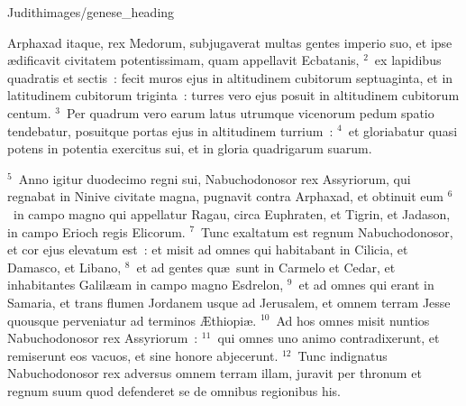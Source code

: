 {Judith}{images/genese_heading}


\bchapter
\lettrine[lines=6,image=true,loversize=0.05,lraise=-0.03]{A}{}rphaxad itaque, rex Medorum, subjugaverat multas gentes imperio suo, et ipse \ae dificavit civitatem potentissimam, quam appellavit Ecbatanis,
${}^{2}$~ex lapidibus quadratis et sectis~: fecit muros ejus in altitudinem cubitorum septuaginta, et in latitudinem cubitorum triginta~: turres vero ejus posuit in altitudinem cubitorum centum.
${}^{3}$~Per quadrum vero earum latus utrumque vicenorum pedum spatio tendebatur, posuitque portas ejus in altitudinem turrium~:
${}^{4}$~et gloriabatur quasi potens in potentia exercitus sui, et in gloria quadrigarum suarum.


${}^{5}$~Anno igitur duodecimo regni sui, Nabuchodonosor rex Assyriorum, qui regnabat in Ninive civitate magna, pugnavit contra Arphaxad, et obtinuit eum
${}^{6}$~in campo magno qui appellatur Ragau, circa Euphraten, et Tigrin, et Jadason, in campo Erioch regis Elicorum.
${}^{7}$~Tunc exaltatum est regnum Nabuchodonosor, et cor ejus elevatum est~: et misit ad omnes qui habitabant in Cilicia, et Damasco, et Libano,
${}^{8}$~et ad gentes qu\ae\ sunt in Carmelo et Cedar, et inhabitantes Galil\ae am in campo magno Esdrelon,
${}^{9}$~et ad omnes qui erant in Samaria, et trans flumen Jordanem usque ad Jerusalem, et omnem terram Jesse quousque perveniatur ad terminos \AE thiopi\ae .
${}^{10}$~Ad hos omnes misit nuntios Nabuchodonosor rex Assyriorum~:
${}^{11}$~qui omnes uno animo contradixerunt, et remiserunt eos vacuos, et sine honore abjecerunt.
${}^{12}$~Tunc indignatus Nabuchodonosor rex adversus omnem terram illam, juravit per thronum et regnum suum quod defenderet se de omnibus regionibus his.

